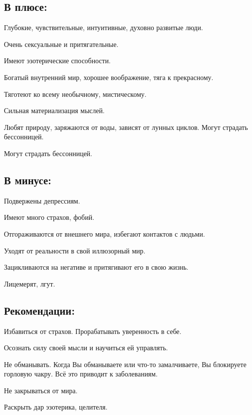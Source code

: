 \subsection{В плюсе:}
\item Глубокие, чувствительные, интуитивные, духовно развитые люди.                            
\item Очень сексуальные и притягательные.                                                      
\item Имеют эзотерические способности.                                                         
\item Богатый внутренний мир, хорошее воображение, тяга к прекрасному.                         
\item Тяготеют ко всему необычному, мистическому.                                              
\item Сильная материализация мыслей.                                                           
\item Любят природу, заряжаются от воды, зависят от лунных циклов.
Могут страдать бессонницей. 
\item Могут страдать бессонницей.
\endsubsection

\subsection{В минусе:}
\item Подвержены депрессиям.                                         
\item Имеют много страхов, фобий.                                    
\item Отгораживаются от внешнего мира, избегают контактов с людьми.  
\item Уходят от реальности в свой иллюзорный мир.                    
\item Зацикливаются на негативе и притягивают его в свою жизнь.      
\item Лицемерят, лгут.                                               
\endsubsection

\subsection{Рекомендации:}
\item Избавиться от страхов. Прорабатывать уверенность в себе.                                                                     
\item Осознать силу своей мысли и научиться ей управлять.                                                                          
\item Не обманывать. Когда Вы обманываете или что-то замалчиваете,
Вы блокируете горловую чакру. Всё это приводит к заболеваниям.  
\item Не закрываться от мира.                                                                                                      
\item Раскрыть дар эзотерика, целителя.                                                                                            
\endsubsection

